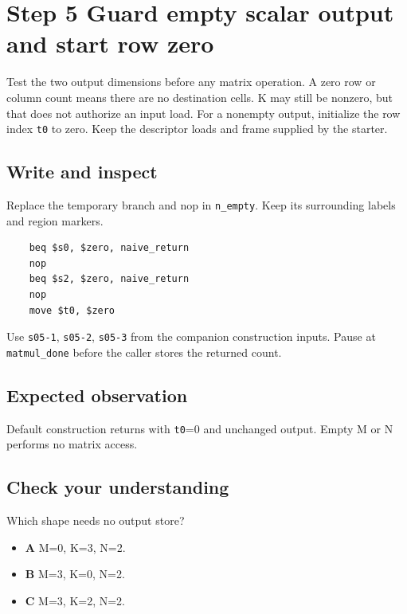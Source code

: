\section{Step 5 Guard empty scalar output and start row zero}\label{matmul-s05}

Test the two output dimensions before any matrix operation. A zero row or column count means there are no destination cells. K may still be nonzero, but that does not authorize an input load. For a nonempty output, initialize the row index \texttt{t0} to zero. Keep the descriptor loads and frame supplied by the starter.

\subsection{Write and inspect}
Replace the temporary branch and nop in \texttt{n\_empty}. Keep its surrounding labels and region markers.

\begin{verbatim}
    beq $s0, $zero, naive_return
    nop
    beq $s2, $zero, naive_return
    nop
    move $t0, $zero
\end{verbatim}
Use \texttt{s05-1}, \texttt{s05-2}, \texttt{s05-3} from the companion construction inputs. Pause at \texttt{matmul\_done} before the caller stores the returned count.

\subsection{Expected observation}
Default construction returns with \texttt{t0}=0 and unchanged output. Empty M or N performs no matrix access.

\subsection{Check your understanding}
Which shape needs no output store?

\begin{itemize}
  \item \textbf{A} M=0, K=3, N=2.
  \item \textbf{B} M=3, K=0, N=2.
  \item \textbf{C} M=3, K=2, N=2.
\end{itemize}
